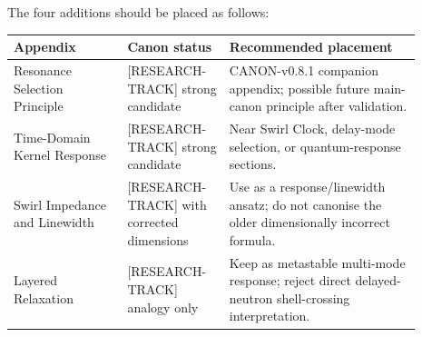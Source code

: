     The four additions should be placed as follows:
    
    \begin{center}
        \begin{tabular}{|p{0.25\linewidth}|p{0.22\linewidth}|p{0.42\linewidth}|}
            \hline
            \textbf{Appendix} & \textbf{Canon status} & \textbf{Recommended placement} \\
            \hline
            Resonance Selection Principle &
            [RESEARCH-TRACK] strong candidate &
            CANON-v0.8.1 companion appendix; possible future main-canon principle after validation. \\
            \hline
            Time-Domain Kernel Response &
            [RESEARCH-TRACK] strong candidate &
            Near Swirl Clock, delay-mode selection, or quantum-response sections. \\
            \hline
            Swirl Impedance and Linewidth &
            [RESEARCH-TRACK] with corrected dimensions &
            Use as a response/linewidth ansatz; do not canonise the older dimensionally incorrect formula. \\
            \hline
            Layered Relaxation &
            [RESEARCH-TRACK] analogy only &
            Keep as metastable multi-mode response; reject direct delayed-neutron shell-crossing interpretation. \\
            \hline
        \end{tabular}
    \end{center}

